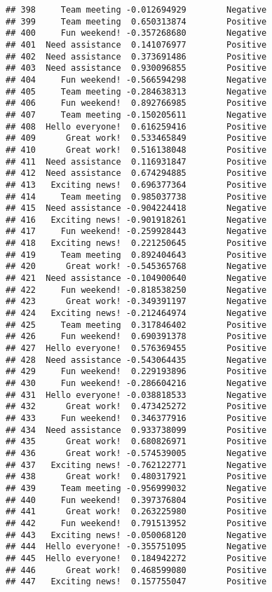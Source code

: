 \documentclass[
]{article}
\begin{document}
\begin{verbatim}
## 398     Team meeting -0.012694929        Negative
## 399     Team meeting  0.650313874        Positive
## 400     Fun weekend! -0.357268680        Negative
## 401  Need assistance  0.141076977        Positive
## 402  Need assistance  0.373691486        Positive
## 403  Need assistance  0.930096855        Positive
## 404     Fun weekend! -0.566594298        Negative
## 405     Team meeting -0.284638313        Negative
## 406     Fun weekend!  0.892766985        Positive
## 407     Team meeting -0.150205611        Negative
## 408  Hello everyone!  0.616259416        Positive
## 409      Great work!  0.533465849        Positive
## 410      Great work!  0.516138048        Positive
## 411  Need assistance  0.116931847        Positive
## 412  Need assistance  0.674294885        Positive
## 413   Exciting news!  0.696377364        Positive
## 414     Team meeting  0.985037738        Positive
## 415  Need assistance -0.904224418        Negative
## 416   Exciting news! -0.901918261        Negative
## 417     Fun weekend! -0.259928443        Negative
## 418   Exciting news!  0.221250645        Positive
## 419     Team meeting  0.892404643        Positive
## 420      Great work! -0.545365768        Negative
## 421  Need assistance -0.104900640        Negative
## 422     Fun weekend! -0.818538250        Negative
## 423      Great work! -0.349391197        Negative
## 424   Exciting news! -0.212464974        Negative
## 425     Team meeting  0.317846402        Positive
## 426     Fun weekend!  0.690391378        Positive
## 427  Hello everyone!  0.576369455        Positive
## 428  Need assistance -0.543064435        Negative
## 429     Fun weekend!  0.229193896        Positive
## 430     Fun weekend! -0.286604216        Negative
## 431  Hello everyone! -0.038818533        Negative
## 432      Great work!  0.473425272        Positive
## 433     Fun weekend!  0.346377916        Positive
## 434  Need assistance  0.933738099        Positive
## 435      Great work!  0.680826971        Positive
## 436      Great work! -0.574539005        Negative
## 437   Exciting news! -0.762122771        Negative
## 438      Great work!  0.480317921        Positive
## 439     Team meeting -0.956999032        Negative
## 440     Fun weekend!  0.397376804        Positive
## 441      Great work!  0.263225980        Positive
## 442     Fun weekend!  0.791513952        Positive
## 443   Exciting news! -0.050068120        Negative
## 444  Hello everyone! -0.355751095        Negative
## 445  Hello everyone!  0.184942272        Positive
## 446      Great work!  0.468599080        Positive
## 447   Exciting news!  0.157755047        Positive

\end{verbatim}
\end{document}
